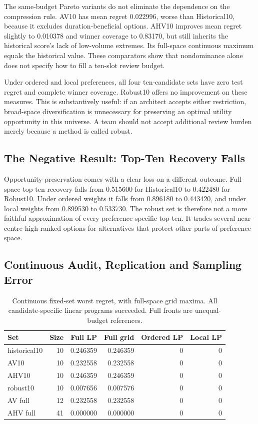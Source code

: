 \documentclass{llncs}
\begin{document}
The same-budget Pareto variants do not eliminate the dependence on the compression rule. AV10 has mean regret 0.022996, worse than Historical10, because it excludes duration-beneficial options. AHV10 improves mean regret slightly to 0.010378 and winner coverage to 0.83170, but still inherits the historical score's lack of low-volume extremes. Its full-space continuous maximum equals the historical value. These comparators show that nondominance alone does not specify how to fill a ten-slot review budget.

Under ordered and local preferences, all four ten-candidate sets have zero test regret and complete winner coverage. Robust10 offers no improvement on these measures. This is substantively useful: if an architect accepts either restriction, broad-space diversification is unnecessary for preserving an optimal utility opportunity in this universe. A team should not accept additional review burden merely because a method is called robust.

\subsection{The Negative Result: Top-Ten Recovery Falls}
Opportunity preservation comes with a clear loss on a different outcome. Full-space top-ten recovery falls from 0.515600 for Historical10 to 0.422480 for Robust10. Under ordered weights it falls from 0.896180 to 0.443420, and under local weights from 0.899530 to 0.533730. The robust set is therefore not a more faithful approximation of every preference-specific top ten. It trades several near-centre high-ranked options for alternatives that protect other parts of preference space.

\subsection{Continuous Audit, Replication and Sampling Error}
\begin{table}[tbp]\caption{Continuous fixed-set worst regret, with full-space grid maxima. All candidate-specific linear programs succeeded. Full fronts are unequal-budget references.}\label{tab:audit}\centering
\small
\begin{tabular}{lrrrrr}\toprule
Set & Size & Full LP & Full grid & Ordered LP & Local LP\\\midrule
historical10 & 10 & 0.246359 & 0.246359 & 0 & 0\\
AV10 & 10 & 0.232558 & 0.232558 & 0 & 0\\
AHV10 & 10 & 0.246359 & 0.246359 & 0 & 0\\
robust10 & 10 & 0.007656 & 0.007576 & 0 & 0\\
AV full & 12 & 0.232558 & 0.232558 & 0 & 0\\
AHV full & 41 & 0.000000 & 0.000000 & 0 & 0\\
\bottomrule\end{tabular}

\end{table}
\end{document}
